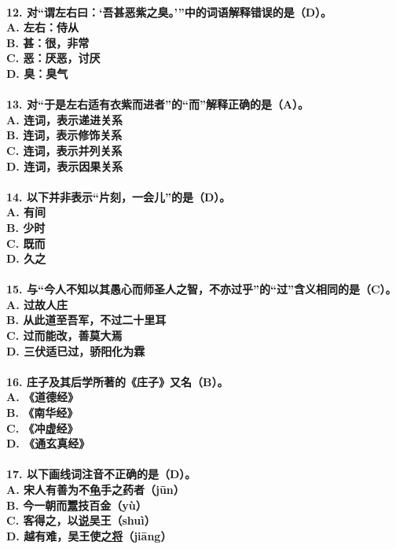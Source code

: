 \documentclass[UTF8]{ctexart} %
\begin{document}
\paragraph{
12. 对“谓左右曰：‘吾甚恶紫之臭。’”中的词语解释错误的是（\color{red}D\color{black}）。 \\
    A. 左右：侍从 \\
    B. 甚：很，非常 \\
    C. 恶：厌恶，讨厌 \\
    D. 臭：臭气
}
\paragraph{
13. 对“于是左右适有衣紫而进者”的“而”解释正确的是（\color{red}A\color{black}）。 \\
    A. 连词，表示递进关系 \\
    B. 连词，表示修饰关系 \\
    C. 连词，表示并列关系 \\
    D. 连词，表示因果关系
}
\paragraph{
14. 以下并非表示“片刻，一会儿”的是（\color{red}D\color{black}）。 \\
    A. 有间 \\
    B. 少时 \\
    C. 既而 \\
    D. 久之
}
\paragraph{
15. 与“今人不知以其愚心而师圣人之智，不亦过乎”的“过”含义相同的是（\color{red}C\color{black}）。 \\
    A. 过故人庄 \\
    B. 从此道至吾军，不过二十里耳 \\
    C. 过而能改，善莫大焉 \\
    D. 三伏适已过，骄阳化为霖
}
\paragraph{
16. 庄子及其后学所著的《庄子》又名（\color{red}B\color{black}）。 \\
    A. 《道德经》 \\
    B. 《南华经》 \\
    C. 《冲虚经》 \\
    D. 《通玄真经》
}
\paragraph{
17. 以下画线词注音不正确的是（\color{red}D\color{black}）。 \\
    A. 宋人有善为不\uline{龟}手之药者（jūn） \\
    B. 今一朝而\uline{鬻}技百金（yù） \\
    C. 客得之，以\uline{说}吴王（shuì） \\
    D. 越有难，吴王使之\uline{将}（jiāng）
}
\end{document}
